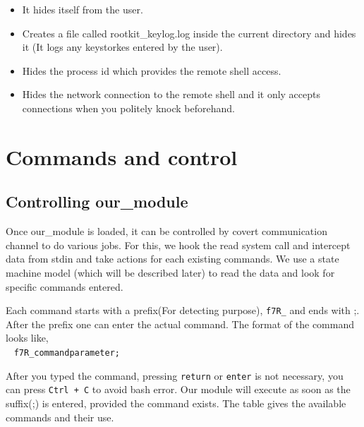 \documentclass[10pt, letterpaper]{scrartcl}
\begin{document}
\begin{itemize}
    \item It hides itself from the user. 
    \item Creates a  file called rootkit\_keylog.log inside the current directory and hides it (It logs any keystorkes entered by the user).
    \item Hides the process id which provides the remote shell access. 
    \item Hides the network connection to the remote shell and it only accepts connections when you politely knock beforehand.
    \end{itemize}


\section{Commands and control}
    \subsection{Controlling our\_module}
    Once our\_module is loaded, it can be controlled by covert communication channel to do various jobs. 
For this, we hook the read system call and intercept data from stdin and take actions for each existing  commands. 
We use a state machine model (which will be described later) to read the data and look for specific commands entered. 

Each command starts with a prefix(For detecting purpose), \texttt{f7R\_} and ends with ;. 
After the prefix one can enter the actual command. The format of the command looks like,
\\~
\texttt{f7R\_command\textvisiblespace parameter;}

After you typed the command, pressing \texttt{return} or \texttt{enter} is not necessary, you can press \texttt{Ctrl + C} to avoid bash error. 
Our module will execute as soon as the suffix(;) is entered, provided the command exists. 
The table %
gives the available commands and their use. 
\end{document}
